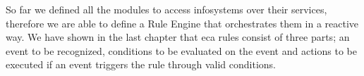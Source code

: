 So far we defined all the modules to access \textrm{\glspl{infosystem}} over their services, therefore we are able to define a \textrm{Rule Engine} that orchestrates them in a reactive way.
We have shown in the last chapter that \textrm{\acrshort{eca}} rules consist of three parts; an event to be recognized, conditions to be evaluated on the event and actions to be executed if an event triggers the rule through valid conditions.






